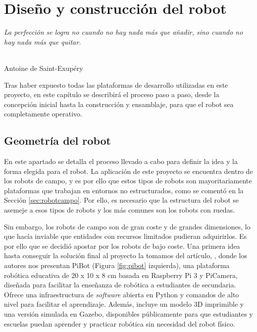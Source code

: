 \chapter{Diseño y construcción del robot}
\label{cap:capitulo5}

\begin{flushright}
\begin{minipage}[]{10cm}
\emph{La perfección se logra no cuando no hay nada más que añadir, sino cuando no hay nada más que quitar.}\\
\end{minipage}\\

Antoine de Saint-Exupéry\\
\end{flushright}

\vspace{1cm}

Tras haber expuesto todas las plataformas de desarrollo utilizadas en este proyecto, en este capítulo se describirá el proceso paso a paso, desde la concepción inicial hasta la construcción y ensamblaje, para que el robot sea completamente operativo.

\section{Geometría del robot}
\label{sec:geometriarobot}

En este apartado se detalla el proceso llevado a cabo para definir la idea y la forma elegida para el robot. La aplicación de este proyecto se encuentra dentro de los robots de campo, y es por ello que estos tipos de robots son mayoritariamente plataformas que trabajan en entornos no estructurados, como se comentó en la Sección \ref{sec:robotcampo}. Por ello, es necesario que la estructura del robot se asemeje a esos tipos de robots y los más comunes son los robots con ruedas. 

Sin embargo, los robots de campo son de gran coste y de grandes dimensiones, lo que hacía inviable que entidades con recursos limitados pudieran adquirirlos. Es por ello que se decidió apostar por los robots de bajo coste. Una primera idea hasta conseguir la solución final al proyecto la tomamos del artículo, \cite{vega18c}, donde los autores nos presentan PiBot (Figura \ref{fig:pibot} izquierda), una plataforma robótica educativa de 20 x 10 x 8 cm basada en Raspberry Pi 3 y PiCamera, diseñada para facilitar la enseñanza de robótica a estudiantes de secundaria. Ofrece una infraestructura de \textit{software} abierta en Python y comandos de alto nivel para facilitar el aprendizaje. Además, incluye un modelo 3D imprimible y una versión simulada en Gazebo, disponibles públicamente para que estudiantes y escuelas puedan aprender y practicar robótica sin necesidad del robot físico. 

